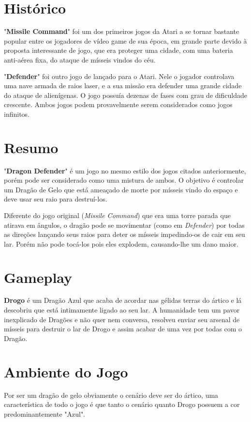 \documentclass[a4paper,11pt]{article}
\begin{document}


\section{Histórico}
"\textbf{Missile Command}" foi um dos primeiros jogos da Atari a se tornar bastante popular entre os jogadores de vídeo game de sua época, em grande parte devido à proposta interessante de jogo, que era proteger uma cidade, com uma bateria anti-aérea fixa, do ataque de mísseis vindos do céu.

"\textbf{Defender}" foi outro jogo de lançado para o Atari. Nele o jogador controlava uma nave armada de raios laser, e a sua missão era defender uma grande cidade do ataque de alienígenas. O jogo possuía dezenas de fases com grau de dificuldade crescente. Ambos jogos podem provavelmente serem considerados como jogos infinitos.

\section{Resumo}
"\textbf{Dragon Defender}" é um jogo no mesmo estilo dos jogos citados anteriormente, porém pode ser considerado como uma mistura de ambos. O objetivo é controlar um Dragão de Gelo que está ameaçado de morte por mísseis vindo do espaço e deve usar seu raio para destruí-los.

Diferente do jogo original (\textit{Missile Command}) que era uma torre parada que atirava em ângulos, o dragão pode se movimentar (como em \textit{Defender}) por todas as direções lançando seus raios para deter os mísseis impedindo-os de cair em seu lar. Porém não pode tocá-los pois eles explodem, causando-lhe um dano maior.

\section{Gameplay}
\textbf{Drogo} é um Dragão Azul que acaba de acordar nas gélidas terras do ártico e lá descobriu que está intimamente ligado ao seu lar. A humanidade tem um pavor inexplicado de Dragões e não quer nem conversa, resolveu enviar seu arsenal de mísseis para destruir o lar de Drogo e assim acabar de uma vez por todas com o Dragão.

\section{Ambiente do Jogo}
Por ser um dragão de gelo obviamente o cenário deve ser do ártico, uma característica de todo o jogo é que tanto o cenário quanto Drogo possuem a cor predominantemente "Azul".
\end{document}

